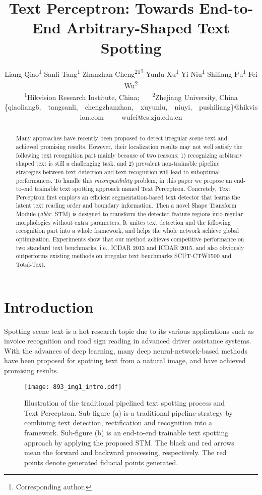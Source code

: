 \documentclass[letterpaper]{article} \usepackage{aaai20}  \usepackage{times}  \usepackage{helvet} \usepackage{courier}  \usepackage[hyphens]{url}  \usepackage{graphicx} \urlstyle{rm} \def\UrlFont{\rm}  \usepackage{graphicx}  \frenchspacing  \setlength{\pdfpagewidth}{8.5in}  \setlength{\pdfpageheight}{11in}  \usepackage{amsmath}
\title{Text Perceptron: Towards End-to-End Arbitrary-Shaped Text Spotting}
\author{Liang Qiao\textsuperscript{1}
	    Sanli Tang\textsuperscript{1}
	    Zhanzhan Cheng\textsuperscript{21}\thanks{Corresponding author.}
	    Yunlu Xu\textsuperscript{1}
	    Yi Niu\textsuperscript{1}
	    Shiliang Pu\textsuperscript{1}
	    Fei Wu\textsuperscript{2}\\
		\textsuperscript{1}Hikvision Research Institute, China; ~~~\textsuperscript{2}Zhejiang University, China\\
\{qiaoliang6,~~tangsanli,~~chengzhanzhan,~~xuyunlu,~~niuyi,~~pushiliang\}@hikvision.com~~~~~wufei@cs.zju.edu.cn
}
\begin{document}
\maketitle

\begin{abstract}
Many approaches have recently been proposed to detect irregular scene text and achieved promising results.
However, their localization results may not well satisfy the following text recognition part mainly because of two reasons:
1) recognizing arbitrary shaped text is still a challenging task, and 2) prevalent non-trainable pipeline strategies between text detection and text recognition will lead to suboptimal performances.
To handle this \emph{incompatibility} problem, in this paper we propose an end-to-end trainable text spotting approach named Text Perceptron.
Concretely, Text Perceptron first employs an efficient segmentation-based text detector that learns the latent text reading order and boundary information.
Then a novel Shape Transform Module (\emph{abbr.} STM) is designed to transform the detected feature regions into regular morphologies without extra parameters.
It unites text detection and the following recognition part into a whole framework, and helps the whole network achieve global optimization.
Experiments show that our method achieves competitive performance on two standard text benchmarks, i.e., ICDAR 2013 and ICDAR 2015, and also obviously outperforms existing methods on irregular text benchmarks SCUT-CTW1500 and Total-Text.
\end{abstract}

\section{Introduction}
Spotting scene text is a hot research topic due to its various applications such as invoice recognition and road sign reading in advanced driver assistance systems.
With the advances of deep learning, many deep neural-network-based methods  \cite{wang2012end,jaderberg2014deep,li2017towards,liu2018fots,he2018end} have been proposed for spotting text from a natural image, and have achieved promising results.
\begin{figure}[ht]
\centering
\texttt{[image: 893\_img1\_intro.pdf]}\\
   \caption{
   Illustration of the traditional pipelined text spotting process and Text Perceptron.
   Sub-figure (a) is a traditional pipeline strategy by combining text detection, rectification and recognition into a framework.
   Sub-figure (b) is an end-to-end trainable text spotting approach by applying the proposed STM.
   The black and red arrows mean the forward and backward processing, respectively.
   The red points denote generated fiducial points generated.
   }
\label{fig:0}
\end{figure}
\end{document}

